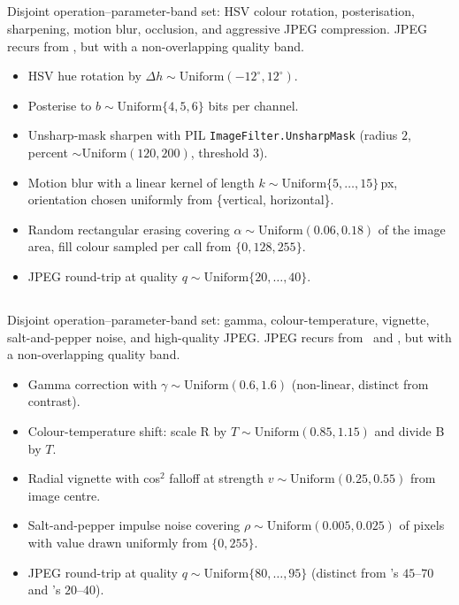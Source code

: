 \subsection*{\strongholdone}
Disjoint operation--parameter-band set: HSV colour rotation,
posterisation, sharpening, motion blur, occlusion, and aggressive JPEG
compression. JPEG recurs from \strongfam, but with a non-overlapping
quality band.
\begin{itemize}
\item HSV hue rotation by $\Delta h \sim \mathrm{Uniform}(-12^{\circ}, 12^{\circ})$.
\item Posterise to $b \sim \mathrm{Uniform}\{4, 5, 6\}$ bits per channel.
\item Unsharp-mask sharpen with PIL \texttt{ImageFilter.UnsharpMask}
      (radius $2$, percent $\sim \mathrm{Uniform}(120, 200)$, threshold $3$).
\item Motion blur with a linear kernel of length $k \sim \mathrm{Uniform}\{5, \dots, 15\}$\,px,
      orientation chosen uniformly from \{vertical, horizontal\}.
\item Random rectangular erasing covering
      $\alpha \sim \mathrm{Uniform}(0.06, 0.18)$ of the image area, fill
      colour sampled per call from $\{0, 128, 255\}$.
\item JPEG round-trip at quality $q \sim \mathrm{Uniform}\{20, \dots, 40\}$.
\end{itemize}

\subsection*{\strongholdtwo}
Disjoint operation--parameter-band set: gamma, colour-temperature,
vignette, salt-and-pepper noise, and high-quality JPEG. JPEG recurs from
\strongfam\ and \strongholdone, but with a non-overlapping quality band.
\begin{itemize}
\item Gamma correction with $\gamma \sim \mathrm{Uniform}(0.6, 1.6)$
      (non-linear, distinct from contrast).
\item Colour-temperature shift: scale R by
      $T \sim \mathrm{Uniform}(0.85, 1.15)$ and divide B by $T$.
\item Radial vignette with cos$^{2}$ falloff at strength
      $v \sim \mathrm{Uniform}(0.25, 0.55)$ from image centre.
\item Salt-and-pepper impulse noise covering
      $\rho \sim \mathrm{Uniform}(0.005, 0.025)$ of pixels with value
      drawn uniformly from $\{0, 255\}$.
\item JPEG round-trip at quality $q \sim \mathrm{Uniform}\{80, \dots, 95\}$
      (distinct from \strongfam's $45$--$70$ and \strongholdone's $20$--$40$).
\end{itemize}

